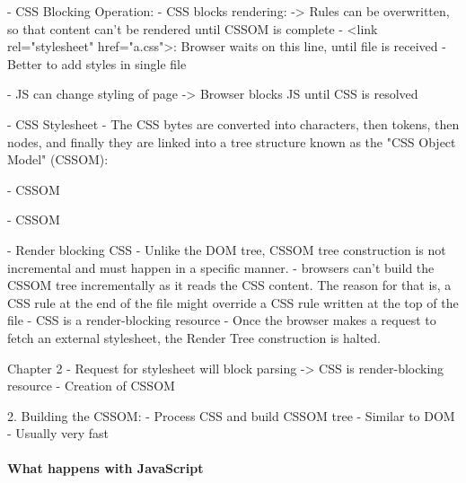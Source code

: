 	
- CSS Blocking Operation:
	- CSS blocks rendering:
	-> Rules can be overwritten, so that content can't be rendered until CSSOM is complete
	- <link rel="stylesheet" href="a.css">: Browser waits on this line, until file is received
	- Better to add styles in single file

	- JS can change styling of page -> Browser blocks JS until CSS is resolved
	
	



- CSS Stylesheet
- The CSS bytes are converted into characters, then tokens, then nodes, and finally they are linked into a tree structure known as the "CSS Object Model" (CSSOM):


- CSSOM

- CSSOM



- Render blocking CSS
- Unlike the DOM tree, CSSOM tree construction is not incremental and must happen in a specific manner.
- browsers can’t build the CSSOM tree incrementally as it reads the CSS content. The reason for that is, a CSS rule at the end of the file might override a CSS rule written at the top of the file
- CSS is a render-blocking resource
- Once the browser makes a request to fetch an external stylesheet, the Render Tree construction is halted.




Chapter 2
- Request for stylesheet will block parsing -> CSS is render-blocking resource
- Creation of CSSOM


2. Building the CSSOM:
- Process CSS and build CSSOM tree
- Similar to DOM
- Usually very fast






\paragraph{What happens with JavaScript}


